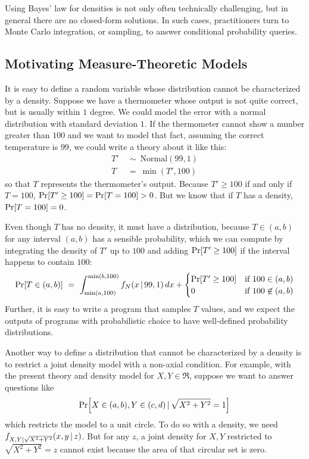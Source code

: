 Using Bayes' law for densities is not only often technically challenging, but in general there are no closed-form solutions.
In such cases, practitioners turn to Monte Carlo integration, or sampling, to answer conditional probability queries.


\subsection{Motivating Measure-Theoretic Models}

It is easy to define a random variable whose distribution cannot be characterized by a density.
Suppose we have a thermometer whose output is not quite correct, but is usually within $1$ degree.
We could model the error with a normal distribution with standard deviation $1$.
If the thermometer cannot show a number greater than $100$ and we want to model that fact, assuming the correct temperature is $99$, we could write a theory about it like this:
\begin{equation}
\begin{aligned}
	T'&\ \sim\ \mathrm{Normal}(99,1) \\
	T&\ =\ \min(T',100)
\end{aligned}
\end{equation}
so that $T$ represents the thermometer's output.
Because $T' \ge 100$ if and only if $T = 100$, $\mathrm{Pr}\!\left[{T' \ge 100}\right] = \mathrm{Pr}\!\left[{T = 100}\right] > 0$.
But we know that if $T$ has a density, $\mathrm{Pr}\!\left[{T = 100}\right] = 0$.

Even though $T$ has no density, it must have a distribution, because $T \in (a,b)$ for any interval $(a,b)$ has a sensible probability, which we can compute by integrating the density of $T'$ up to $100$ and adding $\mathrm{Pr}\!\left[{T' \ge 100}\right]$ if the interval happens to contain $100$:
\begin{equation}
	\Pspec{T \in (a,b)}\ =\ \int_{\min(a,100)}^{\min(b,100)} f_N(x \given 99,1)\,dx +
	\begin{cases}
		\Pspec{T' \ge 100} & \text{if $100 \in (a,b)$} \\
		0 & \text{if $100 \notin (a,b)$}
	\end{cases}
\end{equation}
Further, it is easy to write a program that samples $T$ values, and we expect the outputs of programs with probabilistic choice to have well-defined probability distributions.

Another way to define a distribution that cannot be characterized by a density is to restrict a joint density model with a non-axial condition.
For example, with the present theory and density model for $X,Y \in \Re$, suppose we want to answer questions like
\begin{equation}
	\mathrm{Pr}\!\left[{X \in (a,b),Y \in (c,d) \,|\, \sqrt{X^2 + Y^2} = 1}\right]
\end{equation}
which restricts the model to a unit circle.
To do so with a density, we need $f_{X,Y|\sqrt{X^2+Y^2}}(x,y \,|\, z)$.
But for any $z$, a joint density for $X,Y$ restricted to $\sqrt{X^2+Y^2} = z$ cannot exist because the area of that circular set is zero.

